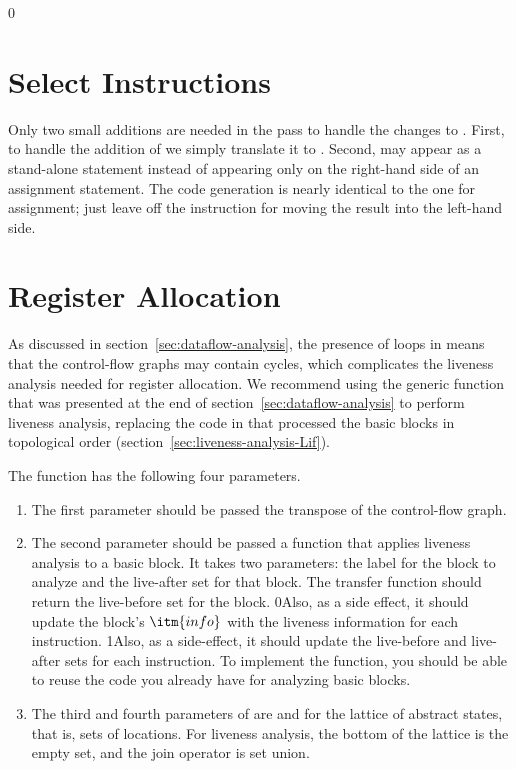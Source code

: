 \documentclass[7x10]{TimesAPriori_MIT}%
\def\racketEd{0}
\def\pythonEd{1}
\def\edition{1}
\newcommand{\racket}[1]{{\if\edition\racketEd{#1}\fi}}
\newcommand{\pythonColor}[0]{}
\newcommand{\python}[1]{{\if\edition\pythonEd\pythonColor #1\fi}}
\numberwithin{theorem}{chapter}
\numberwithin{definition}{chapter}
\numberwithin{equation}{chapter}
\begin{document}
{\if\edition\racketEd
  
\section{Select Instructions}
\label{sec:select-instructions-loop}

Only two small additions are needed in the 
pass to handle the changes to \LangCLoop{}. First, to handle the
addition of \VOID{} we simply translate it to .  Second,
 may appear as a stand-alone statement instead of 
appearing only on the right-hand side of an assignment statement. The code
generation is nearly identical to the one for assignment; just leave
off the instruction for moving the result into the left-hand side.

\fi}

\section{Register Allocation}
\label{sec:register-allocation-loop}

As discussed in section~\ref{sec:dataflow-analysis}, the presence of
loops in \LangLoop{} means that the control-flow graphs may contain cycles,
which complicates the liveness analysis needed for register
allocation.
%
We recommend using the generic  function that
was presented at the end of section~\ref{sec:dataflow-analysis} to
perform liveness analysis, replacing the code in
 that processed the basic blocks in topological
order (section~\ref{sec:liveness-analysis-Lif}).

The  function has the following four parameters.
\begin{enumerate}
\item The first parameter  should be passed the transpose
  of the control-flow graph.
\item The second parameter  should be passed a function
  that applies liveness analysis to a basic block. It takes two
  parameters: the label for the block to analyze and the live-after
  set for that block.  The transfer function should return the
  live-before set for the block.
  \racket{Also, as a side effect, it should update the block's
    $\itm{info}$ with the liveness information for each instruction.}
  \python{Also, as a side-effect, it should update the live-before and
    live-after sets for each instruction.}
  To implement the  function, you should be able to
  reuse the code you already have for analyzing basic blocks.
\item The third and fourth parameters of  are
   and  for the lattice of abstract states,
  that is, sets of locations. For liveness analysis, the bottom of the
  lattice is the empty set, and the join operator is set union.
\end{enumerate}
\end{document}
